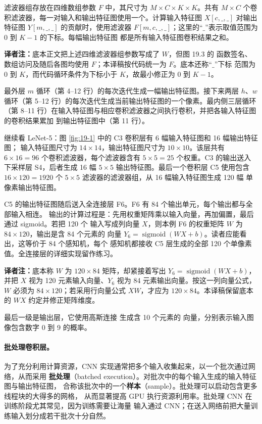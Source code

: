 滤波器组存放在四维数组参数 $F$ 中，其尺寸为 $M\times C\times K\times K$。共有
$M\times C$ 个卷积滤波器，每一对输入和输出特征图使用一个。计算输入特征图
$X[c,\_,\_]$ 对输出特征图 $Y[m,\_,\_]$ 的贡献时，使用滤波器
$F[m,c,\_,\_]$；这里的“$\_$”表示取值范围为 $0$ 到 $K-1$ 的下标。每幅输出特征图
都是所有输入特征图卷积结果之和。

\noindent\textbf{译者注：}底本正文把上述四维滤波器组参数写成了 $W$，但图 19.3 的
函数签名、数组访问及随后各图均使用 $F$；本译稿按代码统一为 $F$。底本还称“$\_$”下标
范围为 0 到 $K$，而代码循环条件为下标小于 $K$，故最小修正为 0 到 $K-1$。

最外层 $m$ 循环（第 4--12 行）的每次迭代生成一幅输出特征图。接下来两层 $h$、$w$
循环（第 5--12 行）的每次迭代生成当前输出特征图的一个像素。最内侧三层循环（第
8--11 行）在输入特征图与相应卷积滤波器之间执行卷积，并把各输入特征图的卷积结果累加
到输出特征图中（第 11 行）。

继续看 LeNet-5：图 \ref{fig:19-1} 中的 C3 卷积层有 6 幅输入特征图和 16 幅输出特征图；
输入特征图尺寸为 $14\times14$，输出特征图尺寸为 $10\times10$。该层共有
$6\times16=96$ 个卷积滤波器，每个滤波器含有 $5\times5=25$ 个权重。C3 的输出送入
下采样层 S4，后者生成 16 幅 $5\times5$ 输出特征图。最后一个卷积层 C5 使用包含
$16\times120=1920$ 个 $5\times5$ 滤波器的滤波器组，从 16 幅输入特征图生成 120 幅
单像素输出特征图。

C5 的输出特征图随后送入全连接层 F6。F6 有 84 个输出单元，每个输出都与全部输入相连。
输出的计算过程是：先用权重矩阵乘以输入向量，再加偏置，最后通过 sigmoid。若把 120 个
输入写成列向量 $X$，则本例 F6 的权重矩阵 $W$ 为 $84\times120$，输出是含 84 个元素的
向量 $Y_6=\operatorname{sigmoid}(WX+b)$。读者应能看出，这等价于 84 个感知机，每个
感知机都接收 C5 层生成的全部 120 个单像素值。全连接层的详细实现留作练习。

\noindent\textbf{译者注：}底本称 $W$ 为 $120\times84$ 矩阵，却紧接着写出
$Y_6=\operatorname{sigmoid}(WX+b)$，并把 $X$ 视为 120 元素输入向量、$Y_6$ 视为
84 元素输出向量。按这一列向量公式，$W$ 必须为 $84\times120$；若采用行向量公式
$XW$，才应为 $120\times84$。本译稿保留底本的 $WX$ 约定并修正矩阵维度。

最后一级是输出层，它使用高斯连接\cite{ch19-lecun1989handwritten} 生成含 10 个元素的
向量，分别表示输入图像包含数字 0 到 9 的概率。

\paragraph{批处理卷积层。}
为了充分利用计算资源，CNN 实现通常把多个输入收集起来，以一个批次通过网络，从而采用
\textbf{批处理}（batched execution）。对批次中的每个输入生成的输入特征图与输出特征图，
合称该批次中的一个\textbf{样本}（sample）。批处理可以启动包含更多线程块的大得多的网格，
从而显著提高 GPU 执行资源利用率。批处理 CNN 在训练阶段尤其常见，因为训练需要让海量
输入通过 CNN；在送入网络前把大量训练输入划分成若干批次十分自然。

